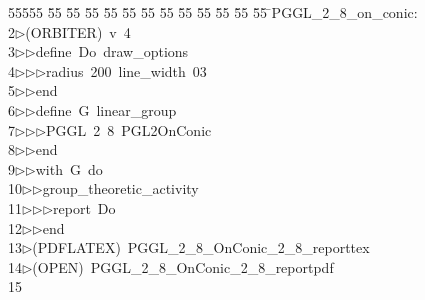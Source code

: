 %
%
\begin{tabbing}
55555 \= 55 \= 55 \= 55 \= 55 \= 55 \= 55 \= 55 \= 55 \= 55 \= 55 \= 55 \= 55 \= \>PGGL\_2\_8\_on\_conic:\\[0pt]
2\>$\triangleright$\>(ORBITER)\ v\ 4\ \\[0pt]
3\>$\triangleright$\>$\triangleright$\>define\ Do\ draw\_options\ \\[0pt]
4\>$\triangleright$\>$\triangleright$\>$\triangleright$\>radius\ 200\ line\_width\ 03\ \\[0pt]
5\>$\triangleright$\>$\triangleright$\>end\ \\[0pt]
6\>$\triangleright$\>$\triangleright$\>define\ G\ linear\_group\ \\[0pt]
7\>$\triangleright$\>$\triangleright$\>$\triangleright$\>PGGL\ 2\ 8\ PGL2OnConic\ \\[0pt]
8\>$\triangleright$\>$\triangleright$\>end\ \\[0pt]
9\>$\triangleright$\>$\triangleright$\>with\ G\ do\ \\[0pt]
10\>$\triangleright$\>$\triangleright$\>group\_theoretic\_activity\ \\[0pt]
11\>$\triangleright$\>$\triangleright$\>$\triangleright$\>report\ Do\ \\[0pt]
12\>$\triangleright$\>$\triangleright$\>end\\[0pt]
13\>$\triangleright$\>(PDFLATEX)\ PGGL\_2\_8\_OnConic\_2\_8\_reporttex\\[0pt]
14\>$\triangleright$\>(OPEN)\ PGGL\_2\_8\_OnConic\_2\_8\_reportpdf\\[0pt]
15\>\end{tabbing}
